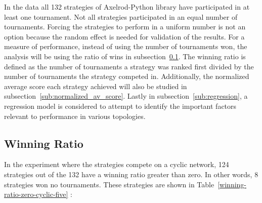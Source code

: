 In the data all 132 strategies of Axelrod-Python library have participated in at
least one tournament. Not all strategies participated in an equal number of tournaments.
Forcing the strategies to perform in a uniform number is
not an option because the random effect is needed for validation of the
results. For a measure of
performance, instead of using the number of tournaments won, the analysis will
be using the ratio of wins in subsection~\ref{sub:winning-ratio}.
The winning ratio is defined as the number of tournaments a strategy was ranked
first divided by the number of tournaments the strategy competed in.
Additionally, the normalized average score each strategy
achieved will also be studied in subsection~\ref{sub:normalized_av_score}.
Lastly in subsection~\ref{sub:regression}, a regression model is considered to
attempt to identify the important factors relevant to performance in various
topologies.

\subsection{Winning Ratio}
\label{sub:winning-ratio}

In the experiment where the
strategies compete on a cyclic network, 124 strategies out of the 132 have a
winning ratio greater than zero. In other words, 8 strategies won no
tournaments. These strategies are shown in Table~\ref{winning-ratio-zero-cyclic-five} :

